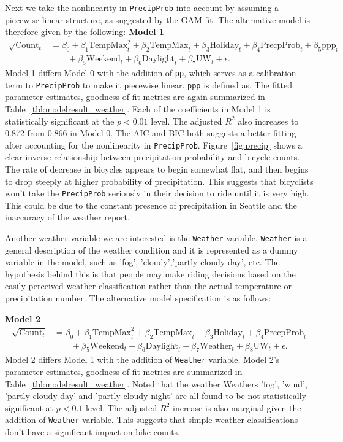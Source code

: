 \documentclass [11pt, proquest] {uwthesis}[2015/03/03]
\begin{document}
Next we take the nonlinearity in \texttt{PrecipProb} into account by assuming a piecewise linear structure, as suggested by the GAM fit. The alternative model is therefore given by the following:
\textbf{Model 1}
\begin{align}
\sqrt{\text{Count}_t} &= \beta_0 + \beta_1 \text{TempMax}^2_t + \beta_2 \text{TempMax}_t + \beta_3 \text{Holiday}_t + \beta_4 \text{PrecpProb}_t + \beta_5 \text{ppp}_t  \nonumber\\
&\qquad + \beta_5 \text{Weekend}_t + \beta_6 \text{Daylight}_t + \beta_7 \text{UW}_t + \epsilon.\label{eqref:model1}
\end{align}
Model 1 differs Model 0 with the addition of \texttt{pp}, which serves as a calibration term to \texttt{PrecipProb} to make it piecewise linear. \texttt{ppp} is defined as. The fitted parameter estimates, goodness-of-fit metrics are again summarized in Table~\ref{tbl:modelresult_weather}. Each of the coefficients in Model 1 is statistically significant at the $p<0.01$ level. The adjusted $R^2$ also increases to 0.872 from 0.866 in Model 0. The AIC and BIC both suggests a better fitting after accounting for the nonlinearity in \texttt{PrecipProb}. Figure~\ref{fig:precip} shows a clear inverse relationship between precipitation probability and bicycle counts. The rate of decrease in bicycles appears to begin somewhat flat, and then begins to drop steeply at higher probability of precipitation. This suggests that bicyclists won't take the \texttt{PrecipProb} seriously in their decision to ride until it is very high. This could be due to the constant presence of precipitation in Seattle and the inaccuracy of the weather report.

Another weather variable we are interested is the \texttt{Weather} variable. \texttt{Weather} is a general description of the weather condition and it is represented as a dummy variable in the model, such as 'fog', 'cloudy','partly-cloudy-day', etc. The hypothesis behind this is that people may make riding decisions based on the easily perceived weather classification rather than the actual temperature or precipitation number. The alternative model specification is as follows:

\textbf{Model 2}
\begin{align}
\sqrt{\text{Count}_t} &= \beta_0 + \beta_1 \text{TempMax}^2_t + \beta_2 \text{TempMax}_t + \beta_3 \text{Holiday}_t + \beta_4 \text{PrecpProb}_t  \nonumber\\
&\qquad + \beta_5 \text{Weekend}_t + \beta_6 \text{Daylight}_t + \beta_7 \text{Weather}_t  + \beta_8 \text{UW}_t + \epsilon.\label{eqref:model2}
\end{align}
Model 2 differs Model 1 with the addition of \texttt{Weather} variable. Model 2's parameter estimates, goodness-of-fit metrics are summarized in Table~\ref{tbl:modelresult_weather}. Noted that the weather Weathers 'fog', 'wind', 'partly-cloudy-day' and 'partly-cloudy-night' are all found to be not statistically significant at $p<0.1$ level. The adjusted $R^2$ increase is also marginal given the addition of \texttt{Weather} variable. This suggests that simple weather classifications don't have a significant impact on bike counts.
\end{document}
